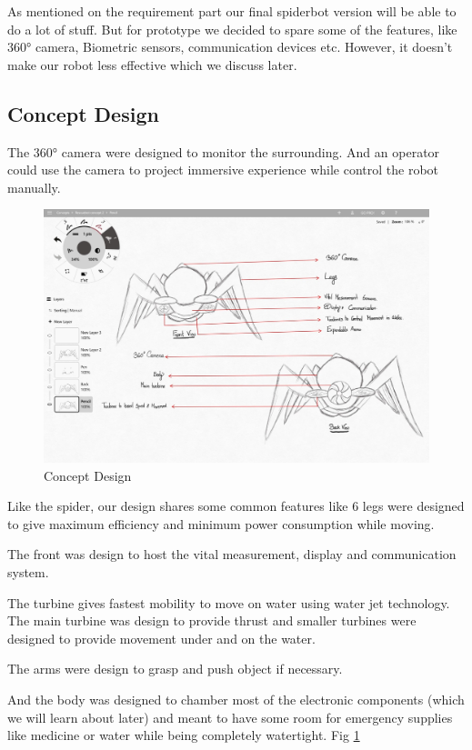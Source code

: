 \documentclass[10pt,journal,compsoc]{IEEEtran}
\begin{document}
As mentioned on the requirement part our final spiderbot version will be able to do a lot of stuff. But for prototype we decided to spare some of the features, like 360° camera, Biometric sensors, communication devices etc. However, it doesn't make our robot less effective which we discuss later. 

\subsection{Concept Design}

The 360° camera were designed to monitor the surrounding. And an operator could use the camera to project immersive experience while control the robot manually.

\begin{figure}[h]
\includegraphics[scale=0.157]{concept}
\caption{Concept Design}
\label{fig:concept}
\end{figure}

Like the spider, our design shares some common features like 6 legs were designed to give maximum efficiency and minimum power consumption while moving.

The front was design to host the vital measurement, display and communication system.

The turbine gives fastest mobility to move on water using water jet technology. The main turbine was design to provide thrust and smaller turbines were designed to provide movement under and on the water.

The arms were design to grasp and push object if necessary.

And the body was designed to chamber most of the electronic components (which we will learn about later) and meant to have some room for emergency supplies like medicine or water while being completely watertight. Fig \ref{fig:concept}
\end{document}
